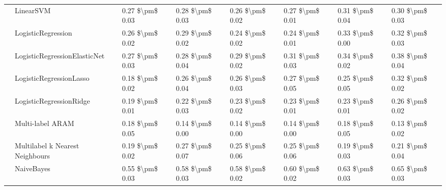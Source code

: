 \begin{tabular}{llllllll}
   & LinearSVM &      0.27 \$\textbackslash pm\$ 0.03 &           0.28 \$\textbackslash pm\$ 0.03 &       0.26 \$\textbackslash pm\$ 0.02 &        0.27 \$\textbackslash pm\$ 0.01 &                         0.31 \$\textbackslash pm\$ 0.04 &      0.30 \$\textbackslash pm\$ 0.03 \\
   & LogisticRegression &      0.26 \$\textbackslash pm\$ 0.02 &           0.29 \$\textbackslash pm\$ 0.02 &       0.24 \$\textbackslash pm\$ 0.02 &        0.24 \$\textbackslash pm\$ 0.01 &                         0.33 \$\textbackslash pm\$ 0.00 &      0.32 \$\textbackslash pm\$ 0.03 \\
   & LogisticRegressionElasticNet &      0.27 \$\textbackslash pm\$ 0.03 &           0.28 \$\textbackslash pm\$ 0.04 &       0.29 \$\textbackslash pm\$ 0.02 &        0.31 \$\textbackslash pm\$ 0.03 &                         0.34 \$\textbackslash pm\$ 0.02 &      0.38 \$\textbackslash pm\$ 0.04 \\
   & LogisticRegressionLasso &      0.18 \$\textbackslash pm\$ 0.02 &           0.26 \$\textbackslash pm\$ 0.04 &       0.26 \$\textbackslash pm\$ 0.03 &        0.27 \$\textbackslash pm\$ 0.05 &                         0.25 \$\textbackslash pm\$ 0.05 &      0.32 \$\textbackslash pm\$ 0.02 \\
   & LogisticRegressionRidge &      0.19 \$\textbackslash pm\$ 0.01 &           0.22 \$\textbackslash pm\$ 0.03 &       0.23 \$\textbackslash pm\$ 0.02 &        0.23 \$\textbackslash pm\$ 0.01 &                         0.23 \$\textbackslash pm\$ 0.01 &      0.26 \$\textbackslash pm\$ 0.02 \\
   & Multi-label ARAM &      0.18 \$\textbackslash pm\$ 0.05 &           0.14 \$\textbackslash pm\$ 0.00 &       0.14 \$\textbackslash pm\$ 0.00 &        0.14 \$\textbackslash pm\$ 0.00 &                         0.18 \$\textbackslash pm\$ 0.05 &      0.13 \$\textbackslash pm\$ 0.02 \\
   & Multilabel k Nearest Neighbours &      0.19 \$\textbackslash pm\$ 0.02 &           0.27 \$\textbackslash pm\$ 0.07 &       0.25 \$\textbackslash pm\$ 0.06 &        0.25 \$\textbackslash pm\$ 0.06 &                         0.19 \$\textbackslash pm\$ 0.03 &      0.21 \$\textbackslash pm\$ 0.04 \\
   & NaiveBayes &      0.55 \$\textbackslash pm\$ 0.03 &           0.58 \$\textbackslash pm\$ 0.03 &       0.58 \$\textbackslash pm\$ 0.02 &        0.60 \$\textbackslash pm\$ 0.02 &                         0.63 \$\textbackslash pm\$ 0.03 &      0.65 \$\textbackslash pm\$ 0.03 \\

\end{tabular}
